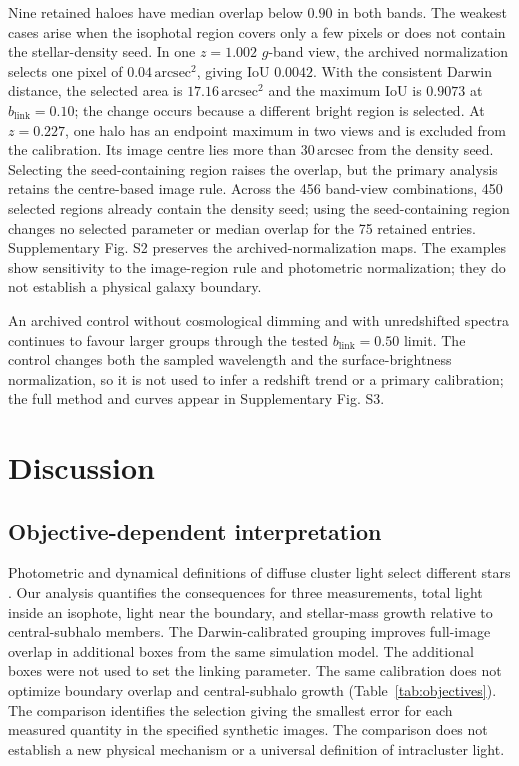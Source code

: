 \documentclass[usenatbib]{mnras}
\begin{document}
Nine retained haloes have median overlap below $0.90$ in both bands.
The weakest cases arise when the isophotal region covers only a few
pixels or does not contain the stellar-density seed. In one $z=1.002$
$g$-band view, the archived normalization selects one pixel of
$0.04\,\mathrm{arcsec}^{2}$, giving IoU $0.0042$. With the consistent
Darwin distance, the selected area is $17.16\,\mathrm{arcsec}^{2}$ and
the maximum IoU is $0.9073$ at $b_{\mathrm{link}}=0.10$; the change
occurs because a different bright region is selected. At $z=0.227$, one
halo has an endpoint maximum in two views and is excluded from the
calibration. Its image centre lies more than $30\,\mathrm{arcsec}$ from
the density seed. Selecting the seed-containing region raises the
overlap, but the primary analysis retains the centre-based image rule.
Across the 456 band-view combinations, 450 selected regions already
contain the density seed; using the seed-containing region changes no
selected parameter or median overlap for the 75 retained entries.
Supplementary Fig. S2 preserves the archived-normalization maps. The
examples show sensitivity to the image-region rule and photometric
normalization; they do not establish a physical galaxy boundary.

An archived control without cosmological dimming and with unredshifted spectra continues to favour larger groups through the tested $b_{\mathrm{link}}=0.50$ limit. The control changes both the sampled wavelength and the surface-brightness normalization, so it is not used to infer a redshift trend or a primary calibration; the full method and curves appear in Supplementary Fig. S3.

\section{Discussion}
\label{sec:use}
\subsection{Objective-dependent interpretation}

Photometric and dynamical definitions
of diffuse cluster light select different stars
\citep{tang2018,montenegro2025}. Our analysis quantifies the consequences
for three measurements, total light inside an isophote, light near the
boundary, and stellar-mass growth relative to central-subhalo members.
The Darwin-calibrated grouping improves
full-image overlap in additional boxes from the same simulation model. The additional boxes were not used to set the linking parameter.
The same calibration does
not optimize boundary overlap and central-subhalo growth (Table~\ref{tab:objectives}).
The comparison identifies the selection giving the smallest error for
each measured quantity in the specified synthetic images. The comparison
does not establish a new physical mechanism or a universal definition of
intracluster light.
\end{document}
